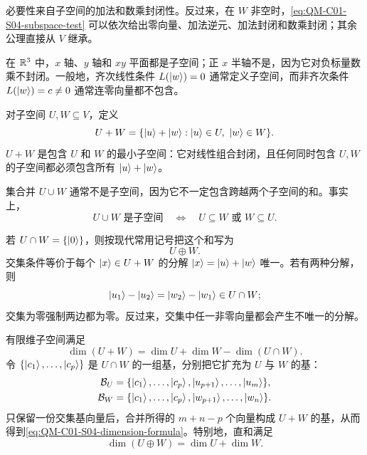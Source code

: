 必要性来自子空间的加法和数乘封闭性。反过来，在 $W$ 非空时，\cref{eq:QM-C01-S04-subspace-test} 可以依次给出零向量、加法逆元、加法封闭和数乘封闭；其余公理直接从 $V$ 继承。

在 $\mathbb{R}^3$ 中，$x$ 轴、$y$ 轴和 $xy$ 平面都是子空间；正 $x$ 半轴不是，因为它对负标量数乘不封闭。一般地，齐次线性条件 $L(\left|w\right\rangle)=0$ 通常定义子空间，而非齐次条件 $L(\left|w\right\rangle)=c\neq0$ 通常连零向量都不包含。



对子空间 $U,W\subseteq V$，定义
\begin{equation}
  U+W=\{\ket{u}+\ket{w}:\ket{u}\in U,\ \ket{w}\in W\}.
  \label{eq:QM-C01-S04-sum}
\end{equation}
$U+W$ 是包含 $U$ 和 $W$ 的最小子空间：它对线性组合封闭，且任何同时包含 $U,W$ 的子空间都必须包含所有 $\left|u\right\rangle+\left|w\right\rangle$。

集合并 $U\cup W$ 通常不是子空间，因为它不一定包含跨越两个子空间的和。事实上，
\begin{equation}
  U\cup W\text{ 是子空间}
  \quad\Longleftrightarrow\quad
  U\subseteq W\text{ 或 }W\subseteq U.
  \label{eq:QM-C01-S04-union-condition}
\end{equation}

若 $U\cap W=\{\left|0\right\rangle\}$，则按现代常用记号把这个和写为
\[
  U\oplus W.
\]
交集条件等价于每个 $\left|x\right\rangle\in U+W$ 的分解 $\left|x\right\rangle=\left|u\right\rangle+\left|w\right\rangle$ 唯一。若有两种分解，则
\[
  \left|u_1\right\rangle-\left|u_2\right\rangle=\left|w_2\right\rangle-\left|w_1\right\rangle\in U\cap W;
\]
交集为零强制两边都为零。反过来，交集中任一非零向量都会产生不唯一的分解。



有限维子空间满足
\begin{equation}
  \boxed{\dim(U+W)=\dim U+\dim W-\dim(U\cap W)}.
  \label{eq:QM-C01-S04-dimension-formula}
\end{equation}
令 $\{\left|c_1\right\rangle,\ldots,\left|c_p\right\rangle\}$ 是 $U\cap W$ 的一组基，分别把它扩充为 $U$ 与 $W$ 的基：
\begin{align*}
  \mathcal B_U&=\{\left|c_1\right\rangle,\ldots,\left|c_p\right\rangle,
  \left|u_{p+1}\right\rangle,\ldots,\left|u_m\right\rangle\},\\
  \mathcal B_W&=\{\left|c_1\right\rangle,\ldots,\left|c_p\right\rangle,
  \left|w_{p+1}\right\rangle,\ldots,\left|w_n\right\rangle\}.
\end{align*}
只保留一份交集基向量后，合并所得的 $m+n-p$ 个向量构成 $U+W$ 的基，从而得到\cref{eq:QM-C01-S04-dimension-formula}。特别地，直和满足
\begin{equation}
  \dim(U\oplus W)=\dim U+\dim W.
  \label{eq:QM-C01-S04-direct-sum-dimension}
\end{equation}

